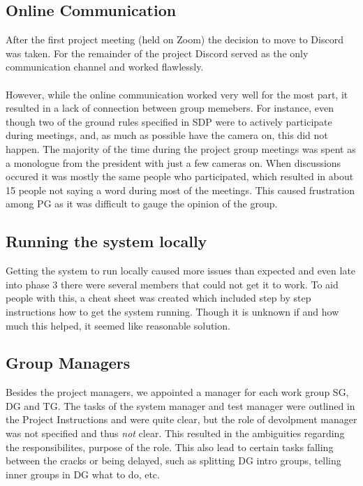 \documentclass{article}
\begin{document}
    \subsection{Online Communication \label{communication}}
        After the first project meeting (held on Zoom) the decision to move to
        Discord was taken. For the remainder of the project Discord served as the only communication channel
        and worked flawlessly.
        \\ \\
        However, while the online communication worked very well for the most part, it resulted
        in a lack of connection between group memebers. For instance, even though two of
        the ground rules specified in SDP were to actively participate during meetings,
        and, as much as possible have the camera on, this did not happen. %
        The majority of the time during the project group meetings was
        spent as a monologue from the president with just a few cameras on. %
        When discussions occured it was mostly the same people who participated, which resulted
        in about 15 people not saying a word during most of the meetings.
        This caused frustration among PG as it was difficult to gauge the opinion of the group.
    
    \subsection{Running the system locally \label{system_locally}}
        Getting the system to run locally caused more issues than expected and even late
        into phase 3 there were several members that could not get it to work.
        To aid people with this, a cheat sheet was created which included step by step
        instructions how to get the system running. Though it is unknown if and how
        much this helped, it seemed like reasonable solution.
        
    \subsection{Group Managers}
        Besides the project managers, we appointed a manager for each work group SG, DG and TG. The tasks of the system manager and test manager were outlined in the Project Instructions and were quite clear, but the role of devolpment manager was not specified and thus \emph{not} clear.
        This resulted in the ambiguities regarding the responsibilites, purpose of the role. This also lead to certain tasks falling between the cracks or being
        delayed, such as splitting DG intro groups, telling inner groups in DG what to do, etc.
\end{document}
